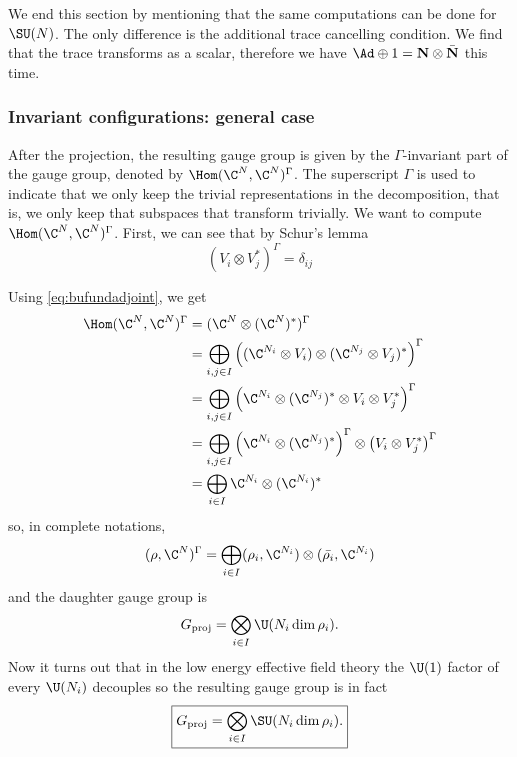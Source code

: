 \documentclass{worksheetclass}
\begin{document}
            We end this section by mentioning that the same computations can be done for $\SU(N)$. The only difference is the additional trace cancelling condition. We find that the trace transforms as a scalar, therefore we have $\Ad\oplus1=\textbf{N}\otimes\bar{\textbf{N}}$ this time.

        \subsubsection{Invariant configurations: general case}
            
            After the projection, the resulting gauge group is given by the $\Gamma$-invariant part of the gauge group, denoted by $\Hom(\C^N,\C^N)^\Gamma$. The superscript $\Gamma$ is used to indicate that we only keep the trivial representations in the decomposition, that is, we only keep that subspaces that transform trivially. We want to compute $\Hom(\C^N,\C^N)^\Gamma$. First, we can see that by Schur's lemma 
            \begin{equation}
                (V_i\otimes V^*_j)^\Gamma=\delta_{ij}
            \end{equation}
            
            Using \eqref{eq:bufundadjoint}, we get
            \begin{align}
                \Hom(\C^N,\C^N)^\Gamma &= (\C^N\otimes(\C^N)^*)^\Gamma\\
                &= \bigoplus_{i,j\in I} \left((\C^{N_i}\otimes V_i)\otimes(\C^{N_j}\otimes V_j)^*\right)^\Gamma\\
                &= \bigoplus_{i,j\in I} \left(\C^{N_i}\otimes(\C^{N_j})^*\otimes V_i\otimes V^*_j\right)^\Gamma\\
                &= \bigoplus_{i,j\in I} \left(\C^{N_i}\otimes(\C^{N_j})^*\right)^\Gamma\otimes\left(V_i\otimes V^*_j\right)^\Gamma\\
                &= \bigoplus_{i\in I}\C^{N_i}\otimes(\C^{N_i})^*
            \end{align}
            so, in complete notations,
            \begin{equation}
                (\rho,\C^N)^\Gamma = \bigoplus_{i\in I}(\rho_i,\C^{N_i})\otimes(\bar{\rho_i},\C^{N_i})
            \end{equation}
            and the daughter gauge group is
            \begin{equation}
                G_{\text{proj}} = \bigotimes_{i\in I}\U(N_i\dim\rho_i).
            \end{equation}
            Now it turns out that in the low energy effective field theory the $\U(1)$ factor of every $\U(N_i)$ decouples  so the resulting gauge group is in fact
            \begin{equation}
                \boxed{G_{\text{proj}} = \bigotimes_{i\in I}\SU(N_i\dim\rho_i).}
            \end{equation}
\end{document}
